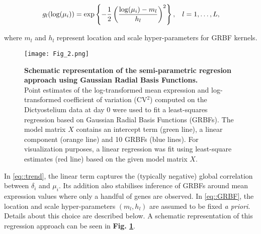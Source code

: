 \begin{equation} \label{eq::GRBF}
g_l(\log(\mu_i)) = \exp\left\lbrace-\frac{1}{2}\left(\dfrac{\log(\mu_i)-m_l}{h_l}\right)^2\right\rbrace, \hspace{0.3cm} l = 1, \ldots, L,
\end{equation} 

where $m_l$ and $h_l$ represent location and scale hyper-parameters for GRBF kernels. 

\begin{figure}[!h]
\centering
\texttt{[image: Fig\_2.png]}
\caption[Schematic representation of the regression approach using GRBFs]{\textbf{Schematic representation of the semi-parametric regresion approach using Gaussian Radial Basis Functions.}\\
Point estimates of the log-transformed mean expression and log-transformed coefficient of variation (CV$^2$) computed on the Dictyostelium data at day 0 \citep{Antolovic2017} were used to fit a least-squares regression based on Gaussian Radial Basis Functions (GRBFs). The model matrix $X$ contains an intercept term (green line), a linear component (orange line) and 10 GRBFs (blue lines). For visualization purposes, a linear regression was fit using least-square estimates (red line) based on the given model matrix $X$.}
\label{fig2:GRBFs}
\end{figure}

In \eqref{eq::trend}, the linear term captures the (typically negative) global correlation between $\delta_i$ and $\mu_i$. Its addition also stabilises inference of GRBFs around mean expression values where only a handful of genes are observed. In \eqref{eq::GRBF}, the location and scale hyper-parameters $(m_l, h_l)$ are assumed to be fixed \emph{a priori}.  Details about this choice are described below. A schematic representation of this regression approach can be seen in \textbf{Fig. \ref{fig2:GRBFs}}.\\

